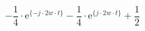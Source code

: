 \[
-\frac{1}{4}\cdot\textrm{e}^{\{-j \cdot 2w \cdot t \}}
-\frac{1}{4}\cdot\textrm{e}^{\{ j \cdot 2w \cdot t \}}
+\frac{1}{2}
\]
